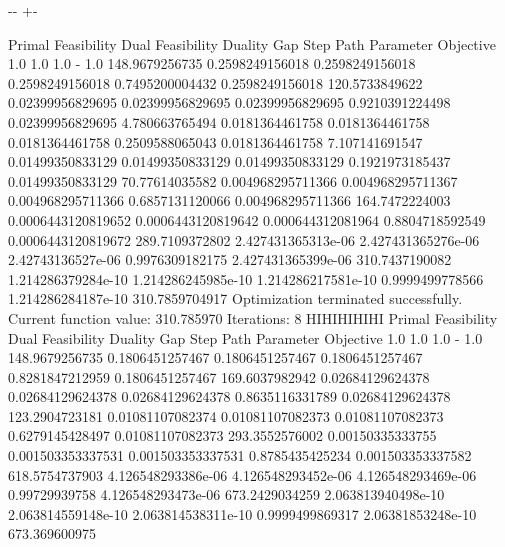 \documentclass[letterpaper,10pt,english]{sphinxmanual}
\newlength\nbsphinxcodecellspacing
\begin{document}
{

\kern-\sphinxverbatimsmallskipamount\kern-\baselineskip
\kern+\FrameHeightAdjust\kern-\fboxrule
\vspace{\nbsphinxcodecellspacing}

\begin{sphinxVerbatim}[commandchars=\\\{\}]
Primal Feasibility  Dual Feasibility    Duality Gap         Step             Path Parameter      Objective
1.0                 1.0                 1.0                 -                1.0                 148.9679256735
0.2598249156018     0.2598249156018     0.2598249156018     0.7495200004432  0.2598249156018     120.5733849622
0.02399956829695    0.02399956829695    0.02399956829695    0.9210391224498  0.02399956829695    4.780663765494
0.0181364461758     0.0181364461758     0.0181364461758     0.2509588065043  0.0181364461758     7.107141691547
0.01499350833129    0.01499350833129    0.01499350833129    0.1921973185437  0.01499350833129    70.77614035582
0.004968295711366   0.004968295711367   0.004968295711366   0.6857131120066  0.004968295711366   164.7472224003
0.0006443120819652  0.0006443120819642  0.000644312081964   0.8804718592549  0.0006443120819672  289.7109372802
2.427431365313e-06  2.427431365276e-06  2.42743136527e-06   0.9976309182175  2.427431365399e-06  310.7437190082
1.214286379284e-10  1.214286245985e-10  1.214286217581e-10  0.9999499778566  1.214286284187e-10  310.7859704917
Optimization terminated successfully.
         Current function value: 310.785970
         Iterations: 8
HIHIHIHIHI
Primal Feasibility  Dual Feasibility    Duality Gap         Step             Path Parameter      Objective
1.0                 1.0                 1.0                 -                1.0                 148.9679256735
0.1806451257467     0.1806451257467     0.1806451257467     0.8281847212959  0.1806451257467     169.6037982942
0.02684129624378    0.02684129624378    0.02684129624378    0.8635116331789  0.02684129624378    123.2904723181
0.01081107082374    0.01081107082373    0.01081107082373    0.6279145428497  0.01081107082373    293.3552576002
0.00150335333755    0.001503353337531   0.001503353337531   0.8785435425234  0.001503353337582   618.5754737903
4.126548293386e-06  4.126548293452e-06  4.126548293469e-06  0.99729939758    4.126548293473e-06  673.2429034259
2.063813940498e-10  2.063814559148e-10  2.063814538311e-10  0.9999499869317  2.06381853248e-10   673.369600975

\end{sphinxVerbatim}}
\end{document}
